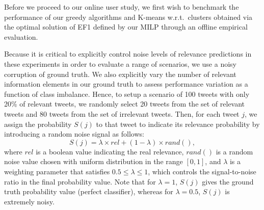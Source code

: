 


Before we proceed to our online user study, we first wish to benchmark the performance of our greedy algorithms and K-means w.r.t.\ clusters obtained via the optimal solution of EF1 defined by our MILP through an offline empirical evaluation.

Because it is critical to explicitly control noise levels of relevance predictions in these experiments in order to evaluate a range of scenarios, we use a noisy corruption of ground truth.
We also explicitly vary the number of relevant information elements in our ground truth to assess performance variation as a function of class imbalance. Hence, to setup a scenario of 100 tweets with only 20\% of relevant tweets, we randomly select 20 tweets from the set of relevant tweets and 80 tweets from the set of irrelevant tweets. Then, for each tweet $j$, we assign the probability $S(j)$ to that tweet to indicate its relevance probability by introducing a random noise signal as follows:
\begin{equation}
S(j) = \lambda\times rel+(1-\lambda)\times rand()  ,
\end{equation}
where $rel$ is a boolean value indicating the real relevance, $rand()$ is a random noise value chosen with uniform distribution in the range $[0,1]$, and $\lambda$ is a weighting parameter  that satisfies $0.5 \leq \lambda \leq 1$, which controls the signal-to-noise ratio in the final probability value. Note that for $\lambda=1$, $S(j)$ gives the ground truth probability value (perfect classifier), whereas for $\lambda=0.5$, $S(j)$ is extremely noisy.


